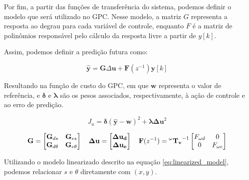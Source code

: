 Por fim, a partir das funções de transferência do sistema,
podemos definir o modelo que será utilizado no GPC.
Nesse modelo, a matriz $G$ representa a resposta ao degrau para cada variável de controle,
enquanto $F$ é a matriz de polinômios responsável pelo cálculo da
resposta livre a partir de $y[k]$.

Assim, podemos definir a predição futura como: 

\begin{equation}
\hat{\mathbf{y}} = \mathbf{G} \Delta \mathbf{u} + \mathbf{F}(z^{-1}) \mathbf{y}[k]
\end{equation}

Resultando na função de custo do GPC, em que $\mathbf{w}$ representa o valor de 
referência, e $\boldsymbol{\delta}$ e $\boldsymbol{\lambda}$ são os pesos associados, 
respectivamente, à ação de controle e ao erro de predição.

\begin{equation}
J_u = \boldsymbol{\delta} (\hat{\mathbf{y}} - \mathbf{w})^2 + \boldsymbol{\lambda} \mathbf{\Delta u}^2
\end{equation}

\[
\mathbf{G} = 
\begin{bmatrix}
\mathbf{G}_{d s} & \mathbf{G}_{e s}\\
\mathbf{G}_{d \theta}  & \mathbf{G}_{e \theta}
\end{bmatrix}
\quad
\mathbf{\Delta u} =
\begin{bmatrix}
\mathbf{\Delta u_d} \\
\mathbf{\Delta u_e}
\end{bmatrix}
\quad
\mathbf{F}(z^{-1}) =
\mathbf{\prescript{\omega}{}{ \mathbf{T}_{v} }}^{-1}
\begin{bmatrix}
F_{\omega d} & 0\\
0 & F_{\omega e}
\end{bmatrix}
\]

Utilizando o modelo linearizado descrito na equação \ref{eq:linearized_model},
podemos relacionar $s$ e $\theta$ diretamente com $(x, y)$.